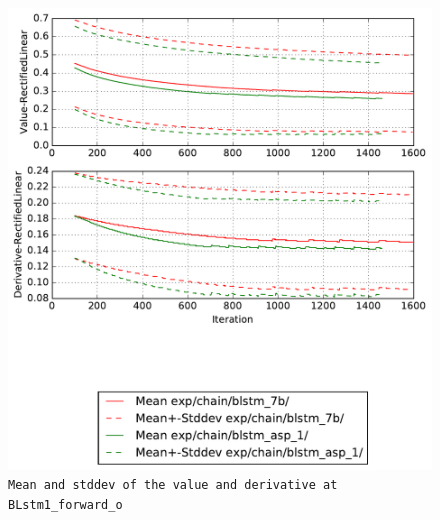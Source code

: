 \documentclass[prl,10pt,twocolumn]{revtex4}
\begin{document}
\newpage
\begin{figure}[h]
  \begin{center}
    \caption{\texttt{Mean and stddev of the value and derivative at BLstm1\_forward\_o}}
    \includegraphics[width=\textwidth]{exp/chain/blstm_7b/report/nonlinstats_BLstm1_forward_o.pdf}
  \end{center}
\end{figure}
\clearpage
\end{document}

